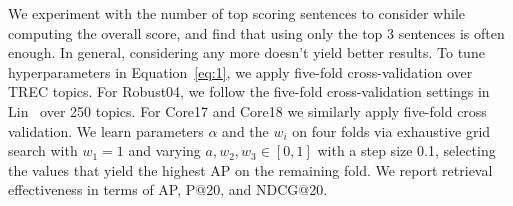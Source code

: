 We experiment with the number of top scoring sentences to consider while computing the overall score, and find that using only the top 3 sentences is often enough.
In general, considering any more doesn't yield better results.
To tune hyperparameters in Equation~\ref{eq:1}, we apply five-fold cross-validation over TREC topics.
For Robust04, we follow the five-fold cross-validation settings in Lin~\cite{lin2019neural} over 250 topics.
For Core17 and Core18 we similarly apply five-fold cross validation.
We learn parameters $\alpha$ and the $w_i$ on four folds via exhaustive grid search with $ w_1 = 1 $ and varying $ a, w_2, w_3 \in [0, 1] $ with a step size 0.1, selecting the values that yield the highest AP on the remaining fold.
We report retrieval effectiveness in terms of AP, P@20, and NDCG@20.
